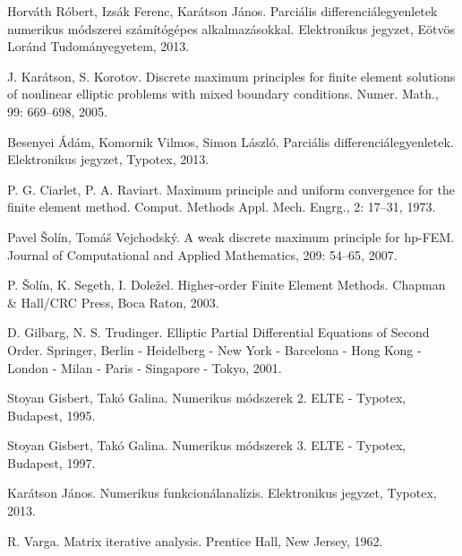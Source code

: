 \documentclass[a4paper,12pt]{report}
\begin{document}
\begin{thebibliography}{9}
	
		Horváth Róbert, Izsák Ferenc, Karátson János. Parciális differenciálegyenletek numerikus módszerei számítógépes alkalmazásokkal. Elektronikus jegyzet, Eötvös Loránd Tudományegyetem, 2013.

		J. Karátson, S. Korotov. Discrete maximum principles for finite element solutions of nonlinear elliptic problems with mixed boundary conditions. Numer. Math., 99: 669–698, 2005.

		Besenyei Ádám, Komornik Vilmos, Simon László. Parciális differenciálegyenletek. Elektronikus jegyzet, Typotex, 2013.
	 
		 P. G. Ciarlet, P. A. Raviart. Maximum principle and uniform convergence for the finite element method. Comput. Methods Appl. Mech. Engrg., 2: 17–31, 1973.

		Pavel Šolín, Tomáš Vejchodský. A weak discrete maximum principle for hp-FEM. Journal of Computational and Applied Mathematics, 209: 54–65, 2007.

		P. Šolín, K. Segeth, I. Doležel. Higher-order Finite Element Methods. Chapman \& Hall/CRC Press, Boca Raton, 2003.
		
		D. Gilbarg, N. S. Trudinger. Elliptic Partial Differential Equations of Second Order. Springer, Berlin - Heidelberg - New York - Barcelona - Hong Kong - London - Milan - Paris - Singapore - Tokyo, 2001.

		Stoyan Gisbert, Takó Galina. Numerikus módszerek 2. ELTE - Typotex, Budapest, 1995.
	
		Stoyan Gisbert, Takó Galina. Numerikus módszerek 3. ELTE - Typotex, Budapest, 1997.
		
	
		Karátson János. Numerikus funkcionálanalízis. Elektronikus jegyzet, Typotex, 2013.	
		
		R. Varga. Matrix iterative analysis. Prentice Hall, New Jersey, 1962.
		
		
	
\end{thebibliography}
\end{document}
